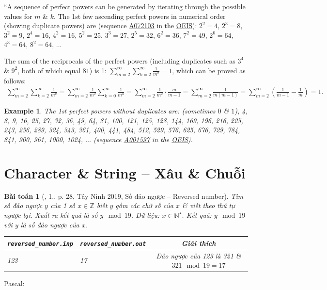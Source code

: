 \documentclass{article}
\newtheorem{baitoan}{Bài toán}
\newtheorem{example}{Example}
\begin{document}
``A sequence of perfect powers can be generated by iterating through the possible values for $m$ \& $k$. The 1st few ascending perfect powers in numerical order (showing duplicate powers) are (sequence \href{https://oeis.org/A072103}{A072103} in the \href{https://en.wikipedia.org/wiki/On-Line_Encyclopedia_of_Integer_Sequences}{OEIS}): $2^2 = 4$, $2^3 = 8$, $3^2 = 9$, $2^4 = 16$, $4^2 = 16$, $5^2 = 25$, $3^3 = 27$, $2^5 = 32$, $6^2 = 36$, $7^2 = 49$, $2^6 = 64$, $4^3 = 64$, $8^2 = 64$, $\ldots$

The sum of the reciprocals of the perfect powers (including duplicates such as $3^4$ \& $9^2$, both of which equal $81$) is 1: $\sum_{m=2}^\infty\sum_{k=2}^\infty \frac{1}{m^k} = 1$, which can be proved as follows:
\begin{align*}
	\sum_{m=2}^\infty\sum_{k=2}^\infty \frac{1}{m^k} = \sum_{m=2}^\infty \frac{1}{m^2}\sum_{k=0}^\infty \frac{1}{m^k} = \sum_{m=2}^\infty \frac{1}{m^2}\cdot\frac{m}{m - 1} = \sum_{m=2}^\infty \frac{1}{m(m - 1)} = \sum_{m=2}^\infty \left(\frac{1}{m - 1} - \frac{1}{m}\right) = 1.
\end{align*}

\begin{example}
	The 1st perfect powers without duplicates are: (sometimes $0$ \& $1$), \emph{4, 8, 9, 16, 25, 27, 32, 36, 49, 64, 81, 100, 121, 125, 128, 144, 169, 196, 216, 225, 243, 256, 289, 324, 343, 361, 400, 441, 484, 512, 529, 576, 625, 676, 729, 784, 841, 900, 961, 1000, 1024}, $\ldots$ (sequence \href{https://oeis.org/A001597}{A001597} in the \href{https://en.wikipedia.org/wiki/On-Line_Encyclopedia_of_Integer_Sequences}{OEIS}).
\end{example}


\section{Character \& String -- Xâu \& Chuỗi}

\begin{baitoan}[\cite{VietSTEM2021}, 1., p. 28, Tây Ninh 2019, Số đảo ngược -- Reversed number]
	Tìm số đảo ngược $y$ của 1 số $x\in\mathbb{Z}$ biết $y$ gồm các chữ số của $x$ \& viết theo thứ tự ngược lại. Xuất ra kết quả là số $y\mod19$. {\sf Dữ liệu:} $x\in\mathbb{N}^\star$. {\sf Kết quả:} $y\mod19$ với $y$ là số đảo ngược của $x$.
	\begin{table}[H]
		\centering
		\begin{tabular}{|l|l|c|}
			\hline
			\verb|reversed_number.inp| & \verb|reversed_number.out| & Giải thích \\
			\hline
			123 & 17 & Đảo ngược của 123 là 321 \& $321\mod19 = 17$ \\
			\hline
		\end{tabular}
	\end{table}
\end{baitoan}
\noindent Pascal:
\end{document}
